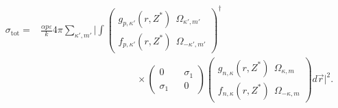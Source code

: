   \begin{align}
    \sigma_{\mathrm{tot}} =& \frac{\alpha p \varepsilon}{k} 4\pi
    \sum_{\kappa',m'} \Bigg|\int\left(\begin{matrix}
          g_{p,\kappa'}(r,Z^*)~~ \Omega_{\kappa',m'}
          \\
          f_{p,\kappa'}(r,Z^*)~~\Omega_{-\kappa',m'}
        \end{matrix}\right)^{\dagger}
        \nonumber
        \\
        &\mspace{180mu}\times\left(\begin{matrix}
          0&&\sigma_1
          \\
          \sigma_1&&0
        \end{matrix}\right)\left(\begin{matrix}
          g_{n,\kappa}(r,Z^*)~~
          \Omega_{\kappa,m}\\f_{n,\kappa}(r,Z^*)~~\Omega_{-\kappa,m}
        \end{matrix}\right)d\vec{r}\Bigg|^2.
  \end{align}
  
